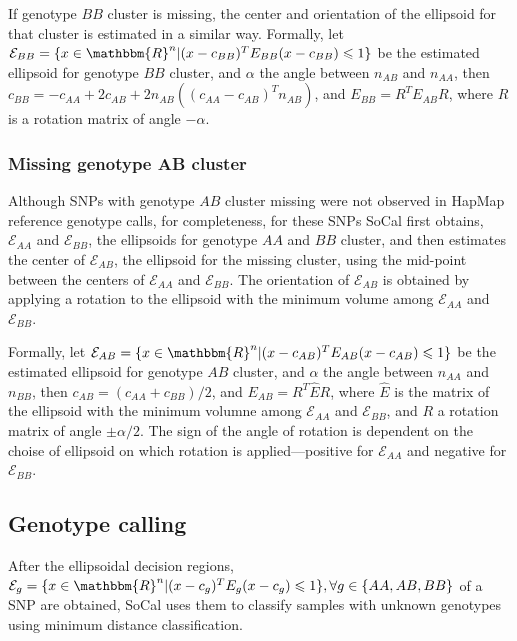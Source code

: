 \documentclass{scrartcl}
\begin{document}
\par
If genotype $BB$ cluster is missing, the center and orientation of the
ellipsoid for that cluster is estimated in a similar way.
Formally, let $\mathcal{E}_{BB}=
\{x \in \mathbbm{R}^{n}|(x-c_{BB})^TE_{BB}(x-c_{BB}) \leqslant 1\}$ be the
estimated ellipsoid for genotype $BB$ cluster, and $\alpha$ the angle between
$n_{AB}$ and $n_{AA}$, then
$c_{BB}=-c_{AA}+2c_{AB}+2n_{AB}((c_{AA}-c_{AB})^{T}n_{AB})$, and
$E_{BB}=R^{T}E_{AB}R$, where $R$ is a rotation matrix of angle $-\alpha$.

\subsubsection{Missing genotype AB cluster}

Although SNPs with genotype $AB$ cluster missing were not observed in HapMap
reference genotype calls, for completeness, for these SNPs SoCal first
obtains, $\mathcal{E}_{AA}$ and $\mathcal{E}_{BB}$,
the ellipsoids for genotype $AA$ and $BB$ cluster, and then estimates the
center of $\mathcal{E}_{AB}$, the ellipsoid for the missing cluster, using
the mid-point between the centers of $\mathcal{E}_{AA}$ and $\mathcal{E}_{BB}$.
The orientation of $\mathcal{E}_{AB}$ is obtained by applying a rotation
to the ellipsoid with the minimum volume among $\mathcal{E}_{AA}$ and
$\mathcal{E}_{BB}$.

\par
Formally, let $\mathcal{E}_{AB}=
\{x \in \mathbbm{R}^{n}|(x-c_{AB})^TE_{AB}(x-c_{AB}) \leqslant 1\}$ be the
estimated ellipsoid for genotype $AB$ cluster, and $\alpha$ the angle between
$n_{AA}$ and $n_{BB}$, then
$c_{AB}=(c_{AA}+c_{BB})/2$, and
$E_{AB}=R^{T}\hat{E}R$, where $\hat{E}$ is the matrix of the ellipsoid
with the minimum volumne among $\mathcal{E}_{AA}$ and $\mathcal{E}_{BB}$, and
$R$ a rotation matrix of angle $\pm\alpha/2$.
The sign of the angle of rotation is dependent on the choise of ellipsoid on
which rotation is applied---positive for $\mathcal{E}_{AA}$ and negative
for $\mathcal{E}_{BB}$.

\subsection{Genotype calling}

\par
After the ellipsoidal decision regions,
$\mathcal{E}_{g}=
\{x \in \mathbbm{R}^{n} | (x-c_g)^TE_g(x-c_g) \leqslant 1\},
\forall g\in\{AA,AB,BB\}$ of a SNP are obtained, SoCal uses them to classify
samples with unknown genotypes using minimum distance classification.
\end{document}
